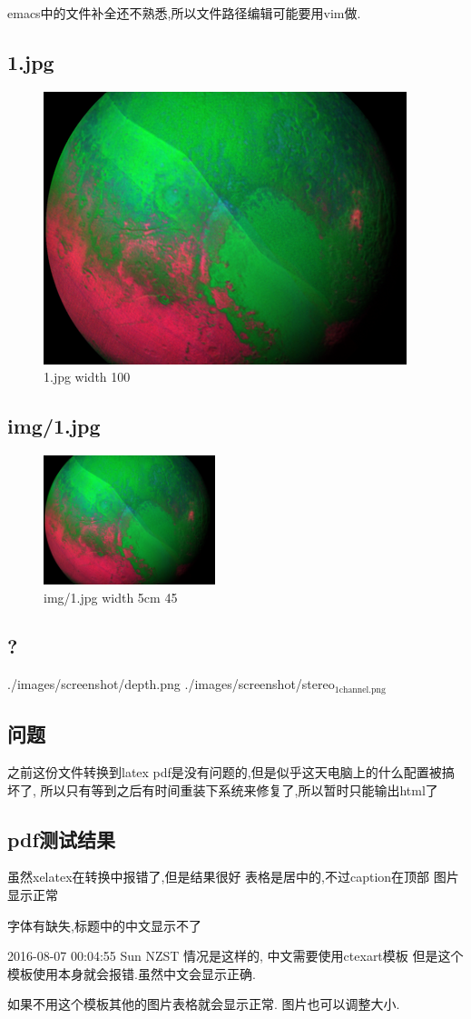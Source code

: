 \documentclass[nofonts]{ctexart}
\begin{document}
emacs中的文件补全还不熟悉,所以文件路径编辑可能要用vim做.
\subsection{1.jpg}
\label{sec:orgheadline5}
\begin{figure}[htb]
\centering
\includegraphics[width=.9\linewidth]{1.jpg}
\caption{\label{fig:orgparagraph2}
1.jpg width 100}
\end{figure}
\subsection{img/1.jpg}
\label{sec:orgheadline6}
\begin{figure}[htb]
\centering
\includegraphics[angle=45,width=5cm]{img/1.jpg}
\caption{\label{fig:orgparagraph3}
img/1.jpg width 5cm 45}
\end{figure}
\subsection{?}
\label{sec:orgheadline7}
./images/screenshot/depth.png
./images/screenshot/stereo\(_{\text{1channel.png}}\)
\subsection{问题}
\label{sec:orgheadline8}
之前这份文件转换到latex pdf是没有问题的,但是似乎这天电脑上的什么配置被搞坏了,
所以只有等到之后有时间重装下系统来修复了,所以暂时只能输出html了
\subsection{pdf测试结果}
\label{sec:orgheadline9}
虽然xelatex在转换中报错了,但是结果很好
表格是居中的,不过caption在顶部
图片显示正常

字体有缺失,标题中的中文显示不了

2016-08-07 00:04:55 Sun NZST
情况是这样的,
中文需要使用ctexart模板
但是这个模板使用本身就会报错.虽然中文会显示正确.

如果不用这个模板其他的图片表格就会显示正常.
图片也可以调整大小.
\end{document}
